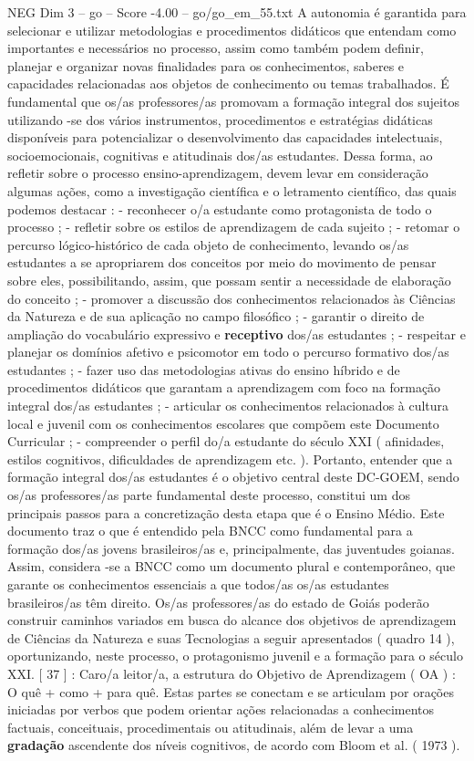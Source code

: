 \begin{textsample}{NEG Dim 3 – go – Score -4.00 – go/go\_em\_55.txt}
A autonomia é garantida para selecionar e utilizar metodologias e procedimentos didáticos que entendam como importantes e necessários no processo, assim como também podem definir, planejar e organizar novas finalidades para os conhecimentos, saberes e capacidades relacionadas aos objetos de conhecimento ou temas trabalhados.
É fundamental que os/as professores/as promovam a formação integral dos sujeitos utilizando -se dos vários instrumentos, procedimentos e estratégias didáticas disponíveis para potencializar o desenvolvimento das capacidades intelectuais, socioemocionais, cognitivas e atitudinais dos/as estudantes.
Dessa forma, ao refletir sobre o processo ensino-aprendizagem, devem levar em consideração algumas ações, como a investigação científica e o letramento científico, das quais podemos destacar : - reconhecer o/a estudante como protagonista de todo o processo ; - refletir sobre os estilos de aprendizagem de cada sujeito ; - retomar o percurso lógico-histórico de cada objeto de conhecimento, levando os/as estudantes a se apropriarem dos conceitos por meio do movimento de pensar sobre eles, possibilitando, assim, que possam sentir a necessidade de elaboração do conceito ; - promover a discussão dos conhecimentos relacionados às Ciências da Natureza e de sua aplicação no campo filosófico ; - garantir o direito de ampliação do vocabulário expressivo e \textbf{receptivo} dos/as estudantes ; - respeitar e planejar os domínios afetivo e psicomotor em todo o percurso formativo dos/as estudantes ; - fazer uso das metodologias ativas do ensino híbrido e de procedimentos didáticos que garantam a aprendizagem com foco na formação integral dos/as estudantes ; - articular os conhecimentos relacionados à cultura local e juvenil com os conhecimentos escolares que compõem este Documento Curricular ; - compreender o perfil do/a estudante do século XXI ( afinidades, estilos cognitivos, dificuldades de aprendizagem etc. ).
Portanto, entender que a formação integral dos/as estudantes é o objetivo central deste DC-GOEM, sendo os/as professores/as parte fundamental deste processo, constitui um dos principais passos para a concretização desta etapa que é o Ensino Médio.
Este documento traz o que é entendido pela BNCC como fundamental para a formação dos/as jovens brasileiros/as e, principalmente, das juventudes goianas.
Assim, considera -se a BNCC como um documento plural e contemporâneo, que garante os conhecimentos essenciais a que todos/as os/as estudantes brasileiros/as têm direito.
Os/as professores/as do estado de Goiás poderão construir caminhos variados em busca do alcance dos objetivos de aprendizagem de Ciências da Natureza e suas Tecnologias a seguir apresentados ( quadro 14 ), oportunizando, neste processo, o protagonismo juvenil e a formação para o século XXI. [ 37 ] : Caro/a leitor/a, a estrutura do Objetivo de Aprendizagem ( OA ) : O quê + como + para quê.
Estas partes se conectam e se articulam por orações iniciadas por verbos que podem orientar ações relacionadas a conhecimentos factuais, conceituais, procedimentais ou atitudinais, além de levar a uma \textbf{gradação} ascendente dos níveis cognitivos, de acordo com Bloom et al. ( 1973 ).

\end{textsample}

